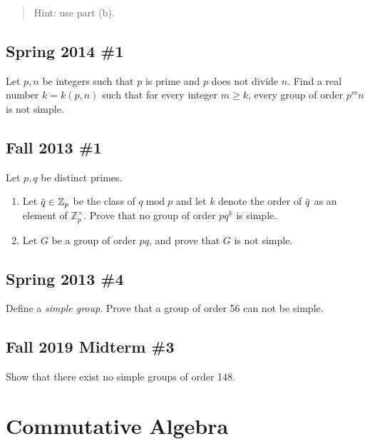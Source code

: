 \begin{quote}
Hint: use part (b).
\end{quote}

\hypertarget{spring-2014-1}{%
\subsection{Spring 2014 \#1}\label{spring-2014-1}}

Let \(p, n\) be integers such that \(p\) is prime and \(p\) does not
divide \(n\). Find a real number \(k = k (p, n)\) such that for every
integer \(m\geq k\), every group of order \(p^m n\) is not simple.

\hypertarget{fall-2013-1}{%
\subsection{Fall 2013 \#1}\label{fall-2013-1}}

Let \(p, q\) be distinct primes.

\begin{enumerate}
\def\labelenumi{\alph{enumi}.}
\item
  Let
  \(\mkern 1.5mu\overline{\mkern-1.5muq\mkern-1.5mu}\mkern 1.5mu \in {\mathbb{Z}}_p\)
  be the class of \(q\operatorname{mod}p\) and let \(k\) denote the
  order of
  \(\mkern 1.5mu\overline{\mkern-1.5muq\mkern-1.5mu}\mkern 1.5mu\) as an
  element of \({\mathbb{Z}}_p^{\times}\). Prove that no group of order
  \(pq^k\) is simple.
\item
  Let \(G\) be a group of order \(pq\), and prove that \(G\) is not
  simple.
\end{enumerate}

\hypertarget{spring-2013-4}{%
\subsection{Spring 2013 \#4}\label{spring-2013-4}}

Define a \emph{simple group}. Prove that a group of order 56 can not be
simple.

\hypertarget{fall-2019-midterm-3}{%
\subsection{Fall 2019 Midterm \#3}\label{fall-2019-midterm-3}}

Show that there exist no simple groups of order 148.

\hypertarget{commutative-algebra}{%
\section{Commutative Algebra}\label{commutative-algebra}}

